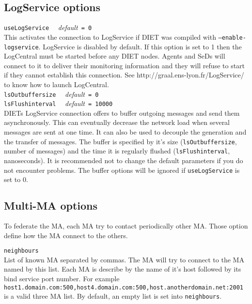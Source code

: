 \subsection{LogService options}

\noindent
\texttt{useLogService} \ \ \emph{default}\texttt{ = 0}\\ This
activates the connection to LogService if DIET was compiled with
\texttt{--enable-logservice}. LogService is disabled by default.  If
this option is set to 1 then the LogCentral must be started before any
DIET nodes. Agents and SeDs will connect to it to deliver their
monitoring information and they will refuse to start if they cannot
establish this connection. See http://graal.ens-lyon.fr/LogService/ to
know how to launch LogCentral.  \\

\noindent
\texttt{lsOutbuffersize} \ \ \emph{default}\texttt{ = 0}\\
\noindent
\texttt{lsFlushinterval} \ \ \emph{default}\texttt{ = 10000}\\ DIETs
LogService connection offers to buffer outgoing messages and send them
asynchronously. This can eventually decrease the network load when
several messages are sent at one time. It can also be used to decouple
the generation and the transfer of messages.  The buffer is specified
by it's size (\texttt{lsOutbuffersize}, number of messages) and the
time it is regularly flushed (\texttt{lsFlushinterval},
nanoseconds). It is recommended not to change the default parameters
if you do not encounter problems. The buffer options will be ignored
if \texttt{useLogService} is set to 0.

\subsection{Multi-MA options}

To federate the MA, each MA try to contact periodically other
MA. Those option define how the MA connect to the others.

\noindent
\texttt{neighbours}\\ List of known MA separated by commas. The MA
will try to connect to the MA named by this list. Each MA is describe
by the name of it's host followed by its bind service port number. For
example
\texttt{host1.domain.com:500,host4.domain.com:500,host.anotherdomain.net:2001}
is a valid three MA list. By default, an empty list is set into
\texttt{neighbours}.\\

